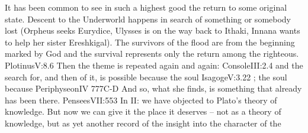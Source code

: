 It has been common to see in such a highest good the return to some original
state. Descent to the Underworld happens in search of something or somebody lost
(Orpheus seeks Eurydice, Ulysses is on the way back to Ithaki, Innana wants to
help her sister Ereshkigal). The survivors of the flood are from the beginning
marked by God and the survival represents only the return among the righteous.
\citet{This excellence whose necessity is scarcely or not at all manifest to
  search, exists, if we could but find it out, before all searching and
  reasoning.}{Plotinus}{V:8.6} Then the theme is repeated again and again:
\citet{in human soul there is engrafted desire of true
  good}{Console}{III:2.4} and the search for, and
then  of it, is possible because the soul \citet{did not forget
  itself completely}{Isagoge}{V:3.22 \verify{}}; the
soul  because \citet{the desire for the bliss, which she had lost,
  remained with her even after the Fall.}{Periphyseon}{IV 777C-D} And
so, what she finds, is something that already has been there.  \citet{Thou
  wouldst not seek Me, if thou hadst not found Me.}{Pensees}{VII:553} In
II: we have objected to Plato's  theory of
knowledge. But now we can give it the place it deserves -- not as a theory of
knowledge, but as yet another record of the insight into the character of the

